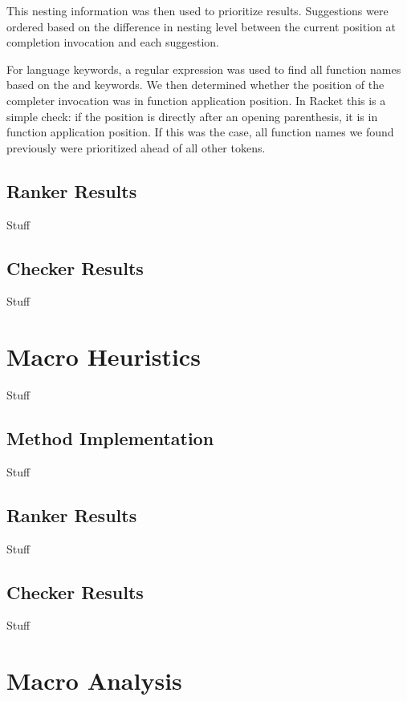 \documentclass[ms,electronic,twosidetoc,letterpaper,chaptercenter,parttop,lol,lof,lot]{byumsphd}
\begin{document}
This nesting information was then used to prioritize results. Suggestions were ordered based on the difference in nesting level between the current position at completion invocation and each suggestion.

For language keywords, a regular expression was used to find all function names based on the  and  keywords. We then determined whether the position of the completer invocation was in function application position. In Racket this is a simple check: if the position is directly after an opening parenthesis, it is in function application position. If this was the case, all function names we found previously were prioritized ahead of all other tokens.

\subsection{Ranker Results}

Stuff

\subsection{Checker Results}

Stuff

\section{Macro Heuristics}

Stuff

\subsection{Method Implementation}

Stuff

\subsection{Ranker Results}

Stuff

\subsection{Checker Results}

Stuff

\section{Macro Analysis}
\end{document}

